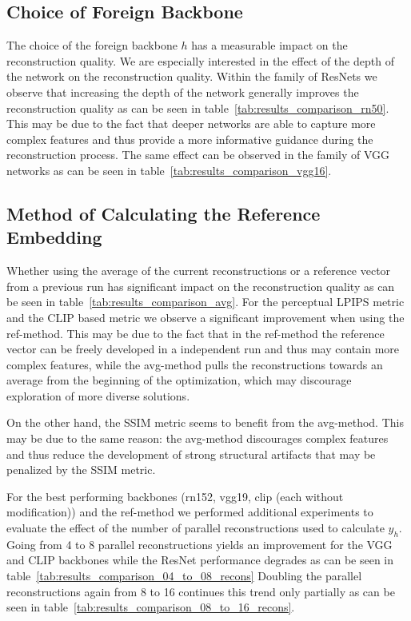\documentclass[10pt,twocolumn]{article}
\begin{document}
\subsection{Choice of Foreign Backbone}
The choice of the foreign backbone $h$ has a measurable impact on the reconstruction quality.
We are especially interested in the effect of the depth of the network on the reconstruction quality.
Within the family of ResNets we observe that increasing the depth of the network generally improves the reconstruction quality as can be seen in table~\ref{tab:results_comparison_rn50}.
This may be due to the fact that deeper networks are able to capture more complex features and thus provide a more informative guidance during the reconstruction process.
The same effect can be observed in the family of VGG networks as can be seen in table~\ref{tab:results_comparison_vgg16}.

\subsection{Method of Calculating the Reference Embedding}
Whether using the average of the current reconstructions or a reference vector from a previous run has significant impact on the reconstruction quality as can be seen in table~\ref{tab:results_comparison_avg}.
For the perceptual LPIPS metric and the CLIP based metric we observe a significant improvement when using the ref-method.
This may be due to the fact that in the ref-method the reference vector can be freely developed in a independent run and thus may contain more complex features, while the avg-method pulls the reconstructions towards an average from the beginning of the optimization, which may discourage exploration of more diverse solutions.

On the other hand, the SSIM metric seems to benefit from the avg-method.
This may be due to the same reason: the avg-method discourages complex features and thus reduce the development of strong structural artifacts that may be penalized by the SSIM metric.

For the best performing backbones (rn152, vgg19, clip (each without modification)) and the ref-method we performed additional experiments to evaluate the effect of the number of parallel reconstructions used to calculate $y_h$.
Going from 4 to 8 parallel reconstructions yields an improvement for the VGG and CLIP backbones while the ResNet performance degrades as can be seen in table~\ref{tab:results_comparison_04_to_08_recons}
Doubling the parallel reconstructions again from 8 to 16 continues this trend only partially as can be seen in table~\ref{tab:results_comparison_08_to_16_recons}.
\end{document}
